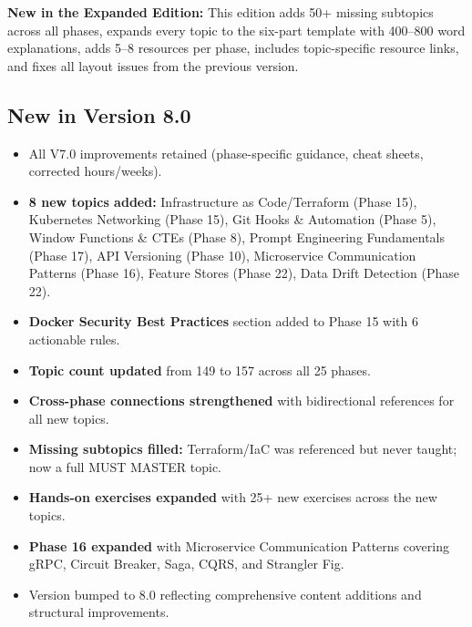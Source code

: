 \documentclass[11pt, a4paper, oneside]{report}
\begin{document}
\textbf{New in the Expanded Edition:} This edition adds 50+ missing subtopics across all phases, expands every topic to the six-part template with 400--800 word explanations, adds 5--8 resources per phase, includes topic-specific resource links, and fixes all layout issues from the previous version.


\subsection*{New in Version 8.0}
\begin{itemize}[leftmargin=*]
\item All V7.0 improvements retained (phase-specific guidance, cheat sheets, corrected hours/weeks).
\item \textbf{8 new topics added:} Infrastructure as Code/Terraform (Phase 15), Kubernetes Networking (Phase 15), Git Hooks \& Automation (Phase 5), Window Functions \& CTEs (Phase 8), Prompt Engineering Fundamentals (Phase 17), API Versioning (Phase 10), Microservice Communication Patterns (Phase 16), Feature Stores (Phase 22), Data Drift Detection (Phase 22).
\item \textbf{Docker Security Best Practices} section added to Phase 15 with 6 actionable rules.
\item \textbf{Topic count updated} from 149 to 157 across all 25 phases.
\item \textbf{Cross-phase connections strengthened} with bidirectional references for all new topics.
\item \textbf{Missing subtopics filled:} Terraform/IaC was referenced but never taught; now a full MUST MASTER topic.
\item \textbf{Hands-on exercises expanded} with 25+ new exercises across the new topics.
\item \textbf{Phase 16 expanded} with Microservice Communication Patterns covering gRPC, Circuit Breaker, Saga, CQRS, and Strangler Fig.
\item Version bumped to 8.0 reflecting comprehensive content additions and structural improvements.
\end{itemize}
\end{document}
